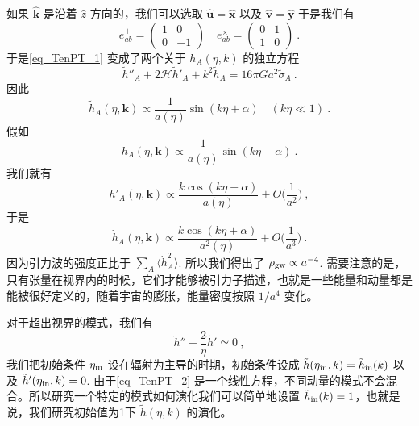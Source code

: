 如果 $\hat{\mathbf k}$ 是沿着 $\hat z$ 方向的，我们可以选取 $\hat{\mathbf u} = \hat{\mathbf x}$ 以及 $\hat{\mathbf v} = \hat{\mathbf y}$ 于是我们有
\begin{equation}
e^+_{ab} = \begin{pmatrix}
1 & 0 \\
0 & -1 
\end{pmatrix} \quad 
e^\times_{ab} = \begin{pmatrix}
0 & 1 \\
1 & 0
\end{pmatrix}
~.
\end{equation}
于是\autoref{eq_TenPT_1} 变成了两个关于 $h_A(\eta,k)$ 的独立方程
\begin{equation}\label{eq_TenPT_2}
\tilde h''_A + 2 \mathcal H \tilde h'_A + k^2\tilde h_A = 16 \pi G a^2 \tilde \sigma_A ~.
\end{equation}
因此
\begin{equation}
\tilde h_A(\eta,\mathbf k) \propto \frac{1}{a(\eta)} \sin(k\eta+\alpha)  \quad (k\eta \ll 1) ~.
\end{equation}
假如
\begin{equation}
h_A(\eta,\mathbf k) \propto \frac{1}{a(\eta)} \sin(k\eta+\alpha)   ~.
\end{equation}
我们就有
\begin{equation}
h'_A(\eta,\mathbf k) \propto \frac{k \cos(k\eta+\alpha)}{a(\eta)} + O \bigg( \frac{1}{a^2} \bigg) ~,
\end{equation}
于是
\begin{equation}
\dot h_A (\eta,\mathbf k) \propto \frac{k\cos(k\eta+\alpha)}{a^2 (\eta)} + O \bigg( \frac{1}{a^3} \bigg)~.
\end{equation}
因为引力波的强度正比于 $\sum_A\langle \dot h_A^2 \rangle$. 所以我们得出了 $\rho_{\rm gw} \propto a^{-4}$. 需要注意的是，只有张量在视界内的时候，它们才能够被引力子描述，也就是一些能量和动量都是能被很好定义的，随着宇宙的膨胀，能量密度按照 $1/a^4$ 变化。

对于超出视界的模式，我们有
\begin{equation}
\tilde h'' + \frac{2}{\eta} \tilde h' \simeq 0 ~,
\end{equation}
我们把初始条件 $\eta_{\rm in}$ 设在辐射为主导的时期，初始条件设成 $\tilde h(\eta_{\rm in},k) = \tilde h_{\rm in} (k)$ 以及 $\tilde h'(\eta_{\rm in},k) = 0$. 由于\autoref{eq_TenPT_2} 是一个线性方程，不同动量的模式不会混合。所以研究一个特定的模式如何演化我们可以简单地设置 $\tilde h_{\rm in}(k) = 1$，也就是说，我们研究初始值为1下 $\tilde h({\eta,k})$ 的演化。

